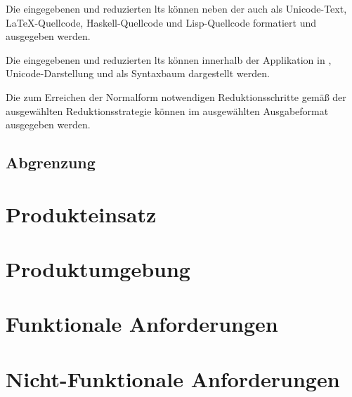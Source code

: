 \documentclass[parskip=full,11pt,twoside]{scrartcl}
\begin{document}
Die eingegebenen und reduzierten \glspl{lt} können neben der 
auch als Unicode-Text, \LaTeX-Quellcode, Haskell-Quellcode und Lisp-Quellcode formatiert und ausgegeben
werden.

Die eingegebenen und reduzierten \glspl{lt} können innerhalb der Applikation in
, Unicode-Darstellung und als Syntaxbaum
dargestellt werden.

Die zum Erreichen der Normalform notwendigen Reduktionsschritte gemäß der ausgewählten
Reduktionsstrategie können im ausgewählten Ausgabeformat ausgegeben werden.



\subsection{Abgrenzung}


\pagebreak
\section{Produkteinsatz}

\section{Produktumgebung}

\section{Funktionale Anforderungen}


\section{Nicht-Funktionale Anforderungen}

\end{document}
